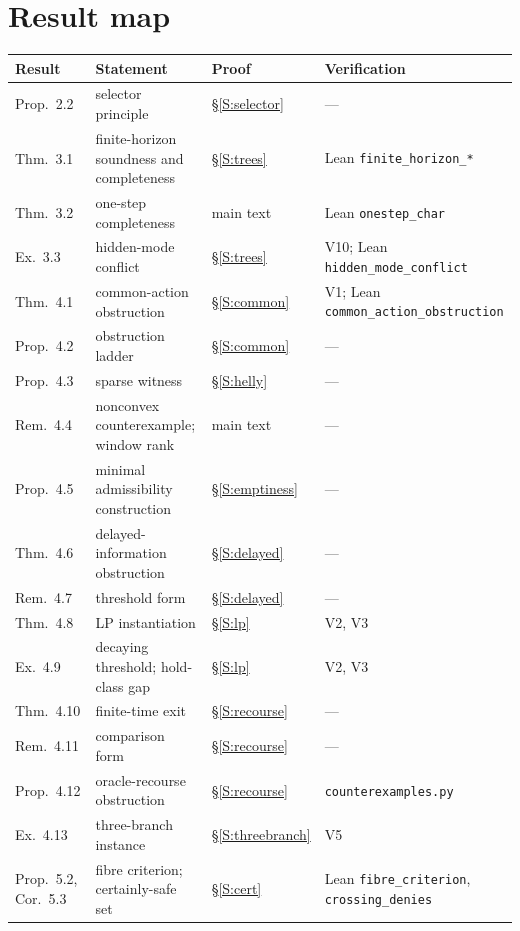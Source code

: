 \section{Result map}\label{S:map}

\begin{table}[htbp]
\centering\small
\begin{tabularx}{\textwidth}{@{}>{\raggedright\arraybackslash}p{}>{\raggedright\arraybackslash}X>{\raggedright\arraybackslash}p{}>{\raggedright\arraybackslash}p{}@{}}
\toprule
Result & Statement & Proof & Verification\\
\midrule
Prop.~2.2 & selector principle & \S\ref{S:selector} & ---\\
Thm.~3.1 & finite-horizon soundness and completeness & \S\ref{S:trees} & Lean \texttt{finite\_horizon\_*}\\
Thm.~3.2 & one-step completeness & main text & Lean \texttt{onestep\_char}\\
Ex.~3.3 & hidden-mode conflict & \S\ref{S:trees} & V10; Lean \texttt{hidden\_mode\_conflict}\\
Thm.~4.1 & common-action obstruction & \S\ref{S:common} & V1; Lean \texttt{common\_action\_obstruction}\\
Prop.~4.2 & obstruction ladder & \S\ref{S:common} & ---\\
Prop.~4.3 & sparse witness & \S\ref{S:helly} & ---\\
Rem.~4.4 & nonconvex counterexample; window rank & main text & ---\\
Prop.~4.5 & minimal admissibility construction & \S\ref{S:emptiness} & ---\\
Thm.~4.6 & delayed-information obstruction & \S\ref{S:delayed} & ---\\
Rem.~4.7 & threshold form & \S\ref{S:delayed} & ---\\
Thm.~4.8 & LP instantiation & \S\ref{S:lp} & V2, V3\\
Ex.~4.9 & decaying threshold; hold-class gap & \S\ref{S:lp} & V2, V3\\
Thm.~4.10 & finite-time exit & \S\ref{S:recourse} & ---\\
Rem.~4.11 & comparison form & \S\ref{S:recourse} & ---\\
Prop.~4.12 & oracle-recourse obstruction & \S\ref{S:recourse} & \texttt{counterexamples.py}\\
Ex.~4.13 & three-branch instance & \S\ref{S:threebranch} & V5\\
Prop.~5.2, Cor.~5.3 & fibre criterion; certainly-safe set & \S\ref{S:cert} & Lean \texttt{fibre\_criterion}, \texttt{crossing\_denies}\\

\end{tabularx}
\end{table}
